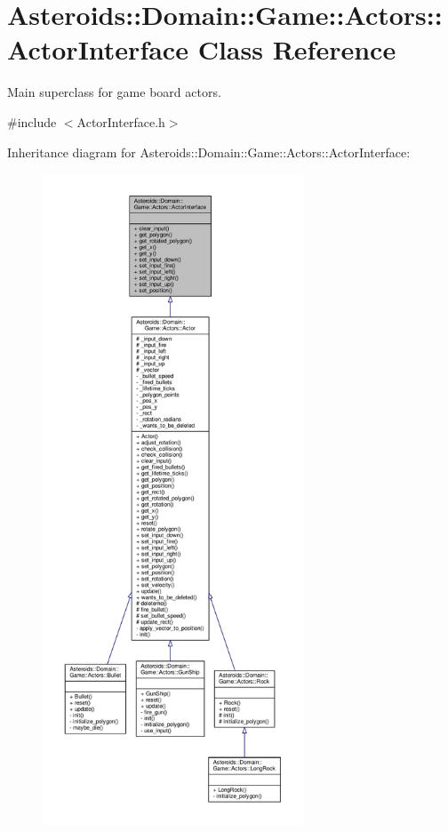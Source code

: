 \hypertarget{classAsteroids_1_1Domain_1_1Game_1_1Actors_1_1ActorInterface}{}\section{Asteroids\+:\+:Domain\+:\+:Game\+:\+:Actors\+:\+:Actor\+Interface Class Reference}
\label{classAsteroids_1_1Domain_1_1Game_1_1Actors_1_1ActorInterface}


Main superclass for game board actors.  




{\ttfamily \#include $<$Actor\+Interface.\+h$>$}



Inheritance diagram for Asteroids\+:\+:Domain\+:\+:Game\+:\+:Actors\+:\+:Actor\+Interface\+:\nopagebreak
\begin{figure}[H]
\begin{center}
\leavevmode
\includegraphics[height=550pt]{classAsteroids_1_1Domain_1_1Game_1_1Actors_1_1ActorInterface__inherit__graph}
\end{center}
\end{figure}


